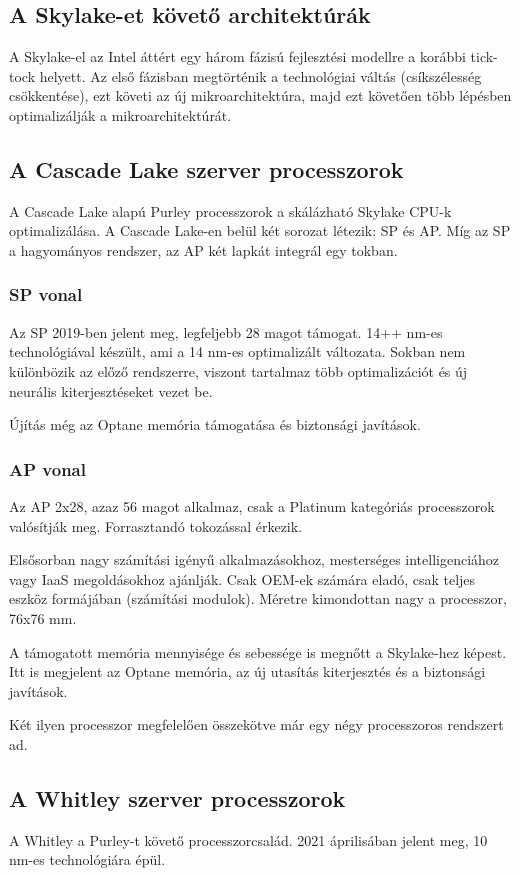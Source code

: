 \subsection{A Skylake-et követő architektúrák}
A Skylake-el az Intel áttért egy három fázisú fejlesztési modellre a korábbi tick-tock helyett.
Az első fázisban megtörténik a technológiai váltás (csíkszélesség csökkentése), ezt követi az új mikroarchitektúra, majd ezt követően több lépésben optimalizálják a mikroarchitektúrát.

\subsection{A Cascade Lake szerver processzorok}
A Cascade Lake alapú Purley processzorok a skálázható Skylake CPU-k optimalizálása.
A Cascade Lake-en belül két sorozat létezik: SP és AP.
Míg az SP a hagyományos rendszer, az AP két lapkát integrál egy tokban.

\subsubsection{SP vonal}
Az SP 2019-ben jelent meg, legfeljebb 28 magot támogat.
14++ nm-es technológiával készült, ami a 14 nm-es optimalizált változata.
Sokban nem különbözik az előző rendszerre, viszont tartalmaz több optimalizációt és új neurális kiterjesztéseket vezet be.

Újítás még az Optane memória támogatása és biztonsági javítások.

\subsubsection{AP vonal}
Az AP 2x28, azaz 56 magot alkalmaz, csak a Platinum kategóriás processzorok valósítják meg.
Forrasztandó tokozással érkezik.

Elsősorban nagy számítási igényű alkalmazásokhoz, mesterséges intelligenciához vagy IaaS megoldásokhoz ajánlják.
Csak OEM-ek számára eladó, csak teljes eszköz formájában (számítási modulok).
Méretre kimondottan nagy a processzor, 76x76 mm.

A támogatott memória mennyisége és sebessége is megnőtt a Skylake-hez képest.
Itt is megjelent az Optane memória, az új utasítás kiterjesztés és a biztonsági javítások.

Két ilyen processzor megfelelően összekötve már egy négy processzoros rendszert ad.

\subsection{A Whitley szerver processzorok}
A Whitley a Purley-t követő processzorcsalád.
2021 áprilisában jelent meg, 10 nm-es technológiára épül.

